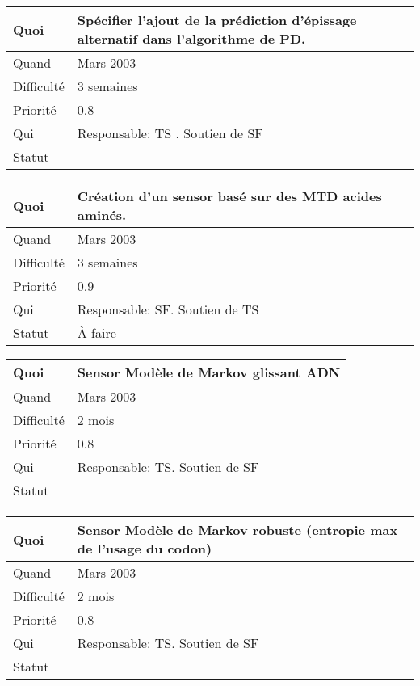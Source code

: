 \documentclass[a4paper,11pt]{article}
\begin{document}
\begin{longtable}{|l|p{7cm}|}\hline
  Quoi & Sp\'ecifier l'ajout de la pr\'ediction d'\'epissage alternatif dans
  l'algorithme de PD. \\\hline
  Quand  &  Mars 2003\\\hline
  Difficult\'e & 3 semaines \\\hline
  Priorit\'e &  0.8\\\hline
  Qui & Responsable: TS . Soutien de SF\\\hline
  Statut & \\\hline
\end{longtable}

\begin{longtable}{|l|p{7cm}|}\hline
  Quoi & Cr\'eation d'un sensor bas\'e sur des MTD acides amin\'es.\\\hline
  Quand  &  Mars 2003\\\hline
  Difficult\'e &  3 semaines\\\hline
  Priorit\'e &  0.9 \\\hline
  Qui & Responsable: SF. Soutien de TS\\\hline
  Statut & \`A faire\\\hline
\end{longtable}

\begin{longtable}{|l|p{7cm}|}\hline
  Quoi & Sensor Mod\`ele de Markov glissant ADN \\\hline
  Quand  &  Mars 2003 \\\hline
  Difficult\'e &  2 mois \\\hline
  Priorit\'e &  0.8 \\\hline
  Qui & Responsable: TS. Soutien de SF\\\hline
  Statut & \\\hline
\end{longtable}

\begin{longtable}{|l|p{7cm}|}\hline
  Quoi & Sensor Mod\`ele de Markov robuste (entropie max de l'usage du codon)\\\hline
  Quand  &  Mars 2003\\\hline
  Difficult\'e &  2 mois\\\hline
  Priorit\'e &  0.8\\\hline
  Qui & Responsable: TS. Soutien de SF\\\hline
  Statut & \\\hline
\end{longtable}
\end{document}

